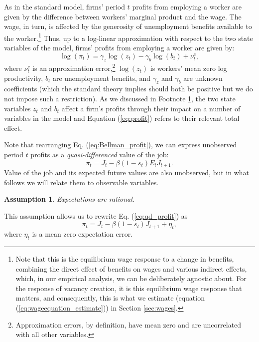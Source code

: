 \documentclass[12pt]{article}
\newcommand{\1}{\mathbf{1}}
\newtheorem{assumption}{Assumption}
\begin{document}
As in the standard \citet{pissarides:00} model, firms' period $t$ profits from employing a worker are given by the difference between workers' marginal product and the wage. The wage, in turn, is affected by the generosity of unemployment benefits available to the worker.\footnote{\label{foot:eqm_wage} Note that this is the equilibrium wage response to a change in benefits, combining the direct effect of benefits on wages and various indirect effects, which, in our empirical analysis, we can be deliberately agnostic about. For the response of vacancy creation, it is this equilibrium wage response that matters, and consequently, this is what we estimate (equation (\ref{eq:wageequation_estimate})) in Section 
\ref{sec:wages}.} Thus, up to a log-linear approximation with respect to the two state variables of the model, firms' profits from employing a worker are given by:
\begin{equation}\label{eq:profit}
\log(\pi_t) = \gamma_z \log(z_t) - \gamma_b \log(b_t) + \nu^c_t,
\end{equation}
where $\nu^c_t$ is an approximation error,\footnote{Approximation errors, by definition, have mean zero and are uncorrelated with all other variables.} $\log(z_t)$ is workers' mean zero log productivity, $b_t$ are unemployment benefits, and $\gamma_z$ and $\gamma_b$ are unknown coefficients (which the standard theory implies should both be positive but we do not impose such a restriction). As we discussed in Footnote \ref{foot:eqm_wage}, the two state variables $z_t$ and $b_t$ affect a firm's profits through their impact on a number of variables in the model and Equation (\ref{eq:profit}) refers to their relevant total effect.

Note that rearranging Eq. (\ref{eq:Bellman_profit}), we can express unobserved period $t$ profits as a \emph{quasi-differenced} value of the job:
\begin{equation} \label{eq:qd_profit}
\pi_t = J_t - \beta(1-s_t) E_t J_{t+1}.
\end{equation}
Value of the job and its expected future values are also unobserved, but in what follows we will relate them to observable variables.

\begin{assumption}\label{ass:rational_exp}
    Expectations are rational. 
\end{assumption}
This assumption allows us to rewrite Eq. (\ref{eq:qd_profit}) as
\begin{equation} \label{eq:qd_profit_noE}
\pi_t = J_t - \beta(1-s_t) J_{t+1} +\eta_t,
\end{equation}
where $\eta_t$ is a mean zero expectation error.
\end{document}
